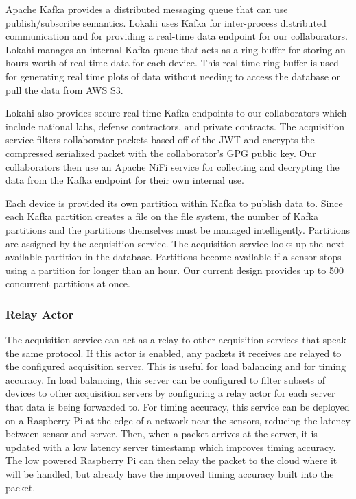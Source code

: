 Apache Kafka provides a distributed messaging queue that can use publish/subscribe semantics. Lokahi uses Kafka for inter-process distributed communication and for providing a real-time data endpoint for our collaborators. Lokahi manages an internal Kafka queue that acts as a ring buffer for storing an hours worth of real-time data for each device. This real-time ring buffer is used for generating real time plots of data without needing to access the database or pull the data from AWS S3.

Lokahi also provides secure real-time Kafka endpoints to our collaborators which include national labs, defense contractors, and private contracts. The acquisition service filters collaborator packets based off of the JWT and encrypts the compressed serialized packet with the collaborator's GPG public key. Our collaborators then use an Apache NiFi service for collecting and decrypting the data from the Kafka endpoint for their own internal use.

Each device is provided its own partition within Kafka to publish data to. Since each Kafka partition creates a file on the file system, the number of Kafka partitions and the partitions themselves must be managed intelligently. Partitions are assigned by the acquisition service. The acquisition service looks up the next available partition in the database. Partitions become available if a sensor stops using a partition for longer than an hour. Our current design provides up to 500 concurrent partitions at once.

\subsubsection{Relay Actor}
The acquisition service can act as a relay to other acquisition services that speak the same protocol. If this actor is enabled, any packets it receives are relayed to the configured acquisition server. This is useful for load balancing and for timing accuracy. In load balancing, this server can be configured to filter subsets of devices to other acquisition servers by configuring a relay actor for each server that data is being forwarded to. For timing accuracy, this service can be deployed on a Raspberry Pi at the edge of a network near the sensors, reducing the latency between sensor and server. Then, when a packet arrives at the server, it is updated with a low latency server timestamp which improves timing accuracy. The low powered Raspberry Pi can then relay the packet to the cloud where it will be handled, but already have the improved timing accuracy built into the packet.

